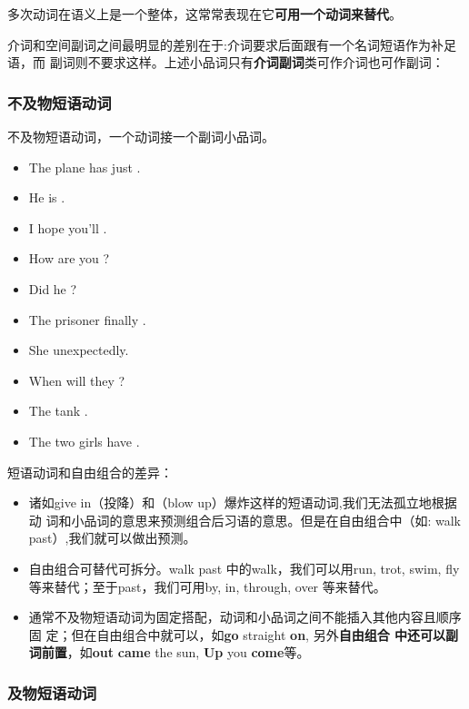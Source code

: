 多次动词在语义上是一个整体，这常常表现在它\textbf{可用一个动词来替代}。

介词和空间副词之间最明显的差别在于:介词要求后面跟有一个名词短语作为补足语，而
副词则不要求这样。上述小品词只有\textbf{介词副词}类可作介词也可作副词：


\subsubsection{不及物短语动词}

不及物短语动词，一个动词接一个副词小品词。
\begin{itemize}
\item The plane has just .
\item He is .
\item I hope you'll .
\item How are you ?
\item Did he ?
\item The prisoner finally .
\item She  unexpectedly.
\item When will they ?
\item The tank .
\item The two girls have .

\end{itemize}

短语动词和自由组合的差异：
\begin{itemize}
\item 诸如give in（投降）和（blow up）爆炸这样的短语动词,我们无法孤立地根据动
  词和小品词的意思来预测组合后习语的意思。但是在自由组合中（如: walk
  past）,我们就可以做出预测。

\item 自由组合可替代可拆分。walk past 中的walk，我们可以用run, trot, swim,
  fly 等来替代；至于past，我们可用by, in, through, over 等来替代。


\item 通常不及物短语动词为固定搭配，动词和小品词之间不能插入其他内容且顺序固
  定；但在自由组合中就可以，如\textbf{go} straight \textbf{on}, 另外\textbf{自由组合
  中还可以副词前置}，如\textbf{out} \textbf{came} the sun, \textbf{Up} you
  \textbf{come}等。

\end{itemize}

\subsubsection{及物短语动词}

